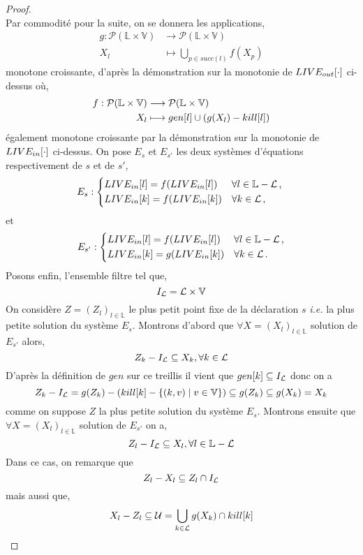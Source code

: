 \documentclass[a4paper, 10pt]{article}
\begin{document}
\begin{proof}
	\\ 
	Par commodité pour la suite, on se donnera les applications,
	\begin{align*}
		g : \mathcal{P}(\mathbb{L} \times \mathbb{V}) &\longrightarrow \mathcal{P}(\mathbb{L} \times \mathbb{V})\\
		X_l &\longmapsto \bigcup\limits_{p\in succ(l)} f(X_p)
	\end{align*}
	monotone croissante, d'après la démonstration sur la monotonie de $LIVE_{out}[\cdot]$ ci-dessus où,
	\begin{align*}
		f : \mathcal{P}(\mathbb{L} \times \mathbb{V}) &\longrightarrow \mathcal{P}(\mathbb{L} \times \mathbb{V})\\
		X_l &\longmapsto gen[l] \cup (g(X_l) - kill[l])
	\end{align*}
	également monotone croissante par la démonstration sur la monotonie de $LIVE_{in}[\cdot]$ ci-dessus.
	On pose $E_s$ et $E_{s'}$ les deux systèmes d'équations respectivement de $s$ et de $s'$,
	\[
	E_s :
	\begin{dcases*}
		\livein{l} = f(\livein{l}) &$\forall l \in \mathbb{L} - \mathcal{L}$\,, \\
		\livein{k} = f(\livein{k}) &$\forall k \in \mathcal{L}$\,,
	\end{dcases*}
	\]
	et
	\[
	E_{s'} :
	\begin{dcases*}
		\livein{l} = f(\livein{l}) &$\forall l \in \mathbb{L} - \mathcal{L}$\,,\\
		\livein{k} = g(\livein{k}) &$\forall k \in \mathcal{L}$\,.
	\end{dcases*}
	\]
	Posons enfin, l'ensemble filtre tel que,
	\[
		I_{\mathcal{L}} = \mathcal{L} \times \mathbb{V}
	\]
	On considère $Z = (Z_l)_{l\in \mathbb{L}}$ le plus petit point fixe de la déclaration $s$ \textit{i.e.} la plus petite solution du système $E_s$.
	Montrons d'abord que $\forall X = (X_l)_{l\in \mathbb{L}}$ solution de $E_{s'}$ alors,
	\[Z_k - I_{\mathcal{L}} \subseteq X_k, \forall k \in \mathcal{L}\]
	D'après la définition de $gen$ sur ce treillis il vient que $gen[k] \subseteq I_{\mathcal{L}}$ donc on a
	\[Z_k - I_{\mathcal{L}} = g(Z_k) - (kill[k] - \{(k, v) \mid v \in \mathbb{V}\}) \subseteq g(Z_k) \subseteq g(X_k) = X_k\]
	comme on suppose $Z$ la plus petite solution du système $E_s$.
	Montrons ensuite que $\forall X = (X_l)_{l\in \mathbb{L}}$ solution de $E_{s'}$ on a,
	\[
		Z_l - I_{\mathcal{L}} \subseteq X_l, \forall l \in \mathbb{L} - \mathcal{L}
	\]
	Dans ce cas, on remarque que 
	\[Z_l - X_l \subseteq Z_l \cap I_{\mathcal{L}}\] 
	mais aussi que, 
	\[X_l - Z_l \subseteq \mathcal{U} = \bigcup\limits_{k\in \mathcal{L}} g(X_k) \cap kill[k]\]

\end{proof}
\end{document}
